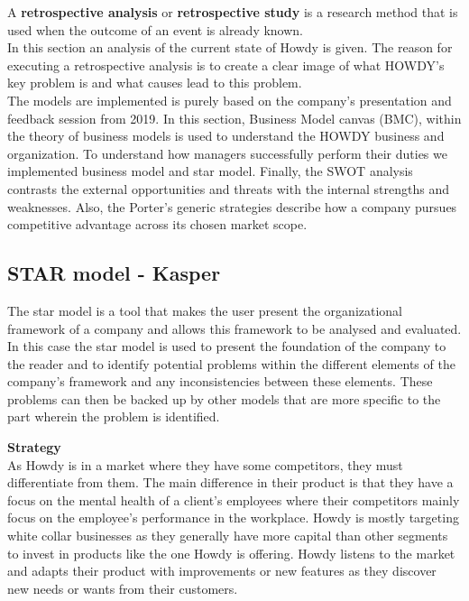 

A \textbf{retrospective analysis} or \textbf{retrospective study} is a research method that is used when the outcome of an event is already known.\\
\noindent In this section an analysis of the current state of Howdy is given. The reason for executing a retrospective analysis is to create a clear image of what HOWDY’s key problem is and what causes lead to this problem.\\
\noindent The models are implemented is purely based on the company’s presentation and feedback session from 2019. In this section, Business Model canvas (BMC), within the theory of business models is used to understand the HOWDY business and organization. To understand how managers successfully perform their duties we implemented business model and star model. Finally, the SWOT analysis contrasts the external opportunities and threats with the internal strengths and weaknesses. Also, the Porter's generic strategies describe how a company pursues competitive advantage across its chosen market scope.



\subsection{STAR model - Kasper}
The star model is a tool that makes the user present the organizational framework of a company and allows this framework to be analysed and evaluated. In this case the star model is used to present the foundation of the company to the reader and to identify potential problems within the different elements of the company’s framework and any inconsistencies between these elements. These problems can then be backed up by other models that are more specific to the part wherein the problem is identified.

\noindent \textbf{Strategy}\\
\noindent As Howdy is in a market where they have some competitors, they must differentiate from them. The main difference in their product is that they have a focus on the mental health of a client’s employees where their competitors mainly focus on the employee’s performance in the workplace. Howdy is mostly targeting white collar businesses as they generally have more capital than other segments to invest in products like the one Howdy is offering.
Howdy listens to the market and adapts their product with improvements or new features as they discover new needs or wants from their customers.

